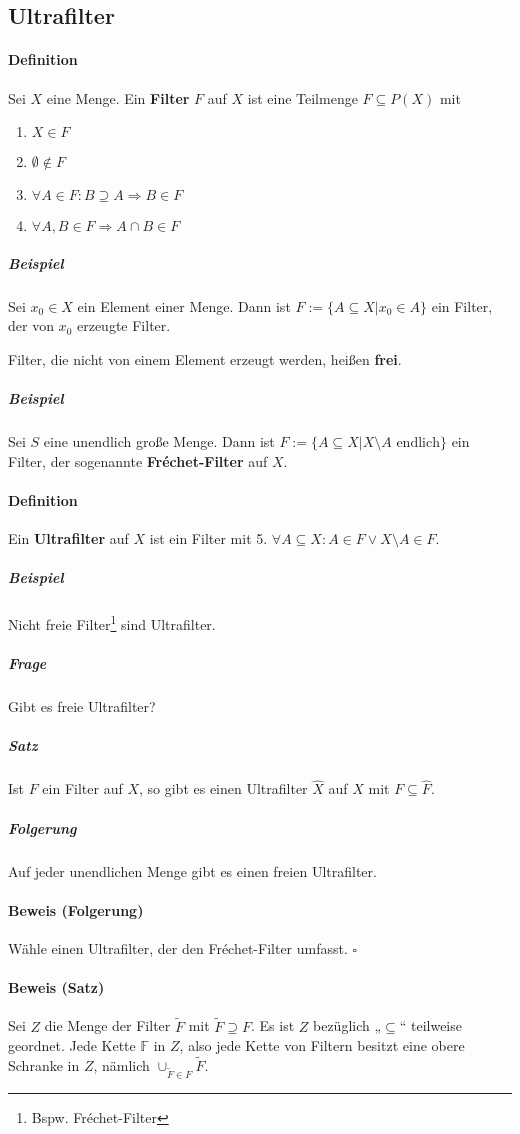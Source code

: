 \documentclass[14pt,a4paper]{article}
\begin{document}
  \subsection{Ultrafilter}
  \paragraph{Definition}
  Sei $X$ eine Menge. Ein \textbf{Filter} $F$ auf $X$ ist eine Teilmenge $F
  \subseteq P(X)$ mit
  \begin{enumerate}
  \item $X \in F$
  \item $\emptyset \notin F$
  \item $\forall A \in F : B \supseteq A \Rightarrow B \in F$
  \item $\forall A,B \in F \Rightarrow A \cap B \in F$
  \end{enumerate}

  \subparagraph{Beispiel}
  Sei $x_0 \in X$ ein Element einer Menge.
  Dann ist $F := \{ A \subseteq X | x_0 \in A\}$ ein Filter, der von $x_0$ erzeugte Filter.

  Filter, die nicht von einem Element erzeugt werden, heißen \textbf{frei}.

	\subparagraph{Beispiel}
		Sei $S$ eine unendlich große Menge.
		Dann ist $F := \{A \subseteq X | X \setminus A \text{ endlich} \}$ ein Filter, der sogenannte \textbf{Fréchet-Filter} auf $X$.
		

	\paragraph{Definition}
		Ein \textbf{Ultrafilter} auf $X$ ist ein Filter mit 5. $\forall A \subseteq X : A \in F \lor X \setminus A \in F$.
		
		\subparagraph{Beispiel}
			Nicht freie Filter\footnote{Bspw. Fréchet-Filter} sind Ultrafilter.
		\subparagraph{Frage}
			Gibt es freie Ultrafilter?
		\subparagraph{Satz}
			Ist $F$ ein Filter auf $X$, so gibt es einen Ultrafilter $\hat{X}$ auf $X$ mit $F \subseteq \hat{F}$.
		\subparagraph{Folgerung}
			Auf jeder unendlichen Menge gibt es einen freien Ultrafilter.
		\paragraph{Beweis (Folgerung)}
			Wähle einen Ultrafilter, der den Fréchet-Filter umfasst.
			$\square$
		\paragraph{Beweis (Satz)}
			Sei $Z$ die Menge der Filter $\widetilde{F}$ mit $\widetilde{F} \supseteq F$.
			Es ist $Z$ bezüglich „$\subseteq$“ teilweise geordnet.
			Jede Kette $\mathbb{F}$ in $Z$, also jede Kette von Filtern besitzt eine obere Schranke in $Z$, nämlich $\cup_{\widetilde{F} \in F} \widetilde{F} $.
\end{document}
